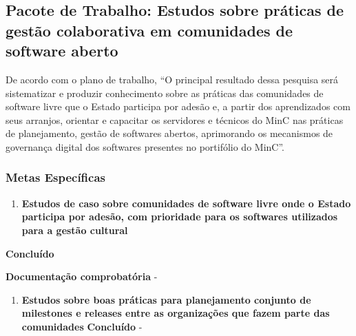\begin{itemize}
f}
\item
  Relatório Etapa 7 -
  \url{https://github.com/lappis-unb/EcossistemasSWLivre/blob/master/Relatorios/R7/RELATÓRIO\%20ETAPA\%207.pdf}
\end{itemize}

\hypertarget{pacote-de-trabalho-estudos-sobre-pruxe1ticas-de-gestuxe3o-colaborativa-em-comunidades-de-software-aberto}{%
\subsection{Pacote de Trabalho: Estudos sobre práticas de gestão
colaborativa em comunidades de software
aberto}\label{pacote-de-trabalho-estudos-sobre-pruxe1ticas-de-gestuxe3o-colaborativa-em-comunidades-de-software-aberto}}

De acordo com o plano de trabalho, ``O principal resultado dessa
pesquisa será sistematizar e produzir conhecimento sobre as práticas das
comunidades de software livre que o Estado participa por adesão e, a
partir dos aprendizados com seus arranjos, orientar e capacitar os
servidores e técnicos do MinC nas práticas de planejamento, gestão de
softwares abertos, aprimorando os mecanismos de governança digital dos
softwares presentes no portifólio do MinC''.

\hypertarget{metas-especuxedficas-2}{%
\subsubsection{Metas Específicas}\label{metas-especuxedficas-2}}

\begin{enumerate}
\def\labelenumi{\arabic{enumi}.}
\tightlist
\item
  \textbf{Estudos de caso sobre comunidades de software livre onde o
  Estado participa por adesão, com prioridade para os softwares
  utilizados para a gestão cultural}
\end{enumerate}

\textbf{Concluído}

\textbf{Documentação comprobatória} -

\begin{enumerate}
\def\labelenumi{\arabic{enumi}.}
\setcounter{enumi}{1}
\tightlist
\item
  \textbf{Estudos sobre boas práticas para planejamento conjunto de
  milestones e releases entre as organizações que fazem parte das
  comunidades} \textbf{Concluído} -
\end{enumerate}

